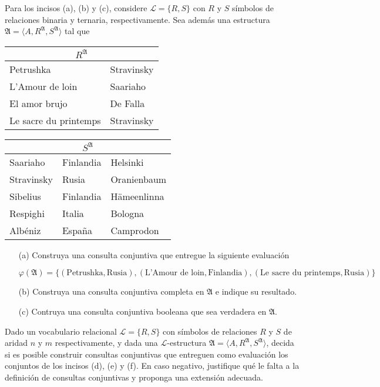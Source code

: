 Para los incisos (a), (b) y (c), considere $\mathcal{L}=\{R,S\}$ con $R$ y $S$ símbolos de relaciones binaria y ternaria, respectivamente. Sea además una estructura $\mathfrak{A}=\langle A,R^\mathfrak{A},S^\mathfrak{A}\rangle$ tal que 
	\begin{center}
		\begin{tabular}{ll}
			\multicolumn{2}{c}{$R^\mathfrak{A}$}                    \\ \hline
			\multicolumn{1}{l|}{Petrushka}             & Stravinsky \\
			\multicolumn{1}{l|}{L'Amour de loin}       & Saariaho   \\
			\multicolumn{1}{l|}{El amor brujo}         & De Falla   \\
			\multicolumn{1}{l|}{Le sacre du printemps} & Stravinsky
			\end{tabular}\hspace{2ex}
		\begin{tabular}{lll}
			\multicolumn{3}{c}{$S^\mathfrak{A}$}                                           \\ \hline
			\multicolumn{1}{l|}{Saariaho}   & \multicolumn{1}{l|}{Finlandia} & Helsinki    \\
			\multicolumn{1}{l|}{Stravinsky} & \multicolumn{1}{l|}{Rusia}     & Oranienbaum \\
			\multicolumn{1}{l|}{Sibelius}   & \multicolumn{1}{l|}{Finlandia} & Hämeenlinna \\
			\multicolumn{1}{l|}{Respighi}   & \multicolumn{1}{l|}{Italia}    & Bologna    \\
			\multicolumn{1}{l|}{Albéniz}   & \multicolumn{1}{l|}{España}    & Camprodon    
			\end{tabular}
	\end{center}
\begin{enumerate}
	\item[(a)] Construya una consulta conjuntiva que entregue la siguiente evaluación 
	\begin{center}
		$\varphi(\mathfrak{A})=\{(\text{Petrushka},\text{Rusia}),(\text{L'Amour de loin},\text{Finlandia}),(\text{Le sacre du printemps},\text{Rusia})\}$
	\end{center}
	\item[(b)] Construya una consulta conjuntiva completa en $\mathfrak{A}$ e indique su resultado.
	\item[(c)] Contruya una consulta conjuntiva booleana que sea verdadera en $\mathfrak{A}$.
\end{enumerate}
Dado un vocabulario relacional $\mathcal{L}=\{R,S\}$ con símbolos de relaciones $R$ y $S$ de aridad $n$ y $m$ respectivamente, y dada una $\mathcal{L}$-estructura $\mathfrak{A}=\langle A, R^\mathfrak{A}, S^\mathfrak{A}\rangle$, decida si es posible construir consultas conjuntivas que entreguen como evaluación los conjuntos de los incisos (d), (e) y (f). En caso negativo, justifique qué le falta a la definición de consultas conjuntivas y proponga una extensión adecuada.
